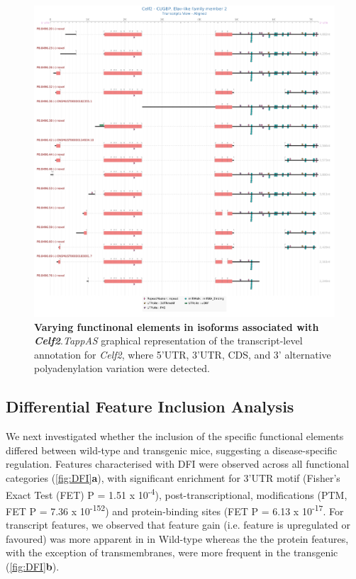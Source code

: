 \begin{figure}[!htp]
	\centering
	\includegraphics[scale = 0.3]{Figures/tappAS_Celf2.png}
	\captionsetup{width=0.95\textwidth}
	\caption[Varying functinonal elements in isoforms associated with \textit{Celf2}]%
	{\textbf{Varying functinonal elements in isoforms associated with \textit{Celf2}}.\textit{TappAS} graphical representation of the transcript-level annotation for \textit{Celf2}, where 5'UTR, 3'UTR, CDS, and 3' alternative polyadenylation variation were detected.}   
	\label{fig:Celf}
\end{figure}	

\subsection{Differential Feature Inclusion Analysis}
We next investigated whether the inclusion of the specific functional elements differed between wild-type and transgenic mice, suggesting a disease-specific regulation. Features characterised with DFI were observed across all functional categories (\cref{fig:DFI}\textbf{a}), with significant enrichment for 3'UTR motif (Fisher's Exact Test (FET) P = 1.51 x 10\textsuperscript{-4}), post-transcriptional,  modifications (PTM, FET P = 7.36 x 10\textsuperscript{-152}) and protein-binding sites (FET P = 6.13 x 10\textsuperscript{-17}. For transcript features, we observed that feature gain (i.e. feature is upregulated or favoured) was more apparent in in Wild-type whereas the the protein features, with the exception of transmembranes, were more frequent in the transgenic (\cref{fig:DFI}\textbf{b}). 



